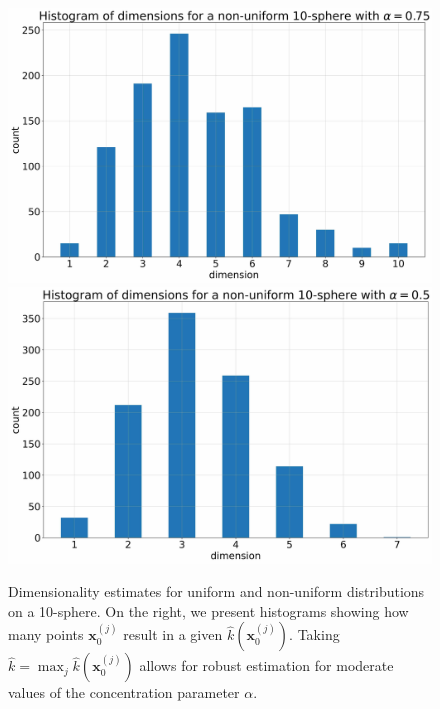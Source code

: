 \begin{figure}
\begin{minipage}[t]{0.5\textwidth}
        \includegraphics[width=0.95\linewidth]{chapter3/figures/non_uniform/dims_0.75.jpg}
        \includegraphics[width=0.95\linewidth]{chapter3/figures/non_uniform/dims_0.5.jpg}
    \end{minipage}
    \caption{Dimensionality estimates for uniform and non-uniform distributions on a 10-sphere. On the right, we present histograms showing how many points $\textbf{x}_0^{(j)}$ result in a given $\hat{k}(\textbf{x}_0^{(j)})$. Taking $\hat{k} = \max_j \hat{k}(\textbf{x}_0^{(j)})$ allows for robust estimation for moderate values of the concentration parameter $\alpha$.}
    \label{ch3:fig:non_uniform}
\end{figure}

    
